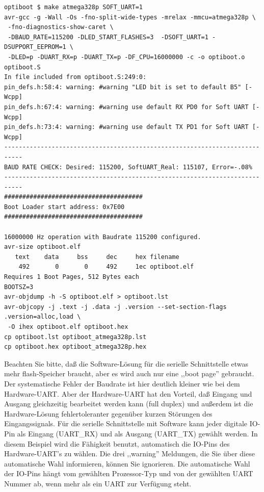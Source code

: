 \begin{verbatim}
optiboot $ make atmega328p SOFT_UART=1
avr-gcc -g -Wall -Os -fno-split-wide-types -mrelax -mmcu=atmega328p \
 -fno-diagnostics-show-caret \
 -DBAUD_RATE=115200 -DLED_START_FLASHES=3  -DSOFT_UART=1 -DSUPPORT_EEPROM=1 \
 -DLED=p -DUART_RX=p -DUART_TX=p -DF_CPU=16000000 -c -o optiboot.o optiboot.S
In file included from optiboot.S:249:0:
pin_defs.h:58:4: warning: #warning "LED bit is set to default B5" [-Wcpp]
pin_defs.h:67:4: warning: #warning use default RX PD0 for Soft UART [-Wcpp]
pin_defs.h:73:4: warning: #warning use default TX PD1 for Soft UART [-Wcpp]
---------------------------------------------------------------------------
BAUD RATE CHECK: Desired: 115200, SoftUART_Real: 115107, Error=-.08%
---------------------------------------------------------------------------
######################################
Boot Loader start address: 0x7E00
######################################

16000000 Hz operation with Baudrate 115200 configured.
avr-size optiboot.elf
   text	   data	    bss	    dec	    hex	filename
    492	      0	      0	    492	    1ec	optiboot.elf
Requires 1 Boot Pages, 512 Bytes each
BOOTSZ=3
avr-objdump -h -S optiboot.elf > optiboot.lst
avr-objcopy -j .text -j .data -j .version --set-section-flags .version=alloc,load \
 -O ihex optiboot.elf optiboot.hex
cp optiboot.lst optiboot_atmega328p.lst
cp optiboot.hex optiboot_atmega328p.hex
\end{verbatim}

Beachten Sie bitte, daß die Software-Lösung für die serielle Schnittstelle etwas mehr flash-Speicher braucht,
aber es wird auch nur eine ,,boot page'' gebraucht. Der systematische Fehler der Baudrate ist hier deutlich kleiner
wie bei dem Hardware-UART.
Aber der Hardware-UART hat den Vorteil, daß Eingang und Ausgang gleichzeitig bearbeitet werden kann (full duplex) und 
außerdem ist die Hardware-Lösung fehlertoleranter gegenüber kurzen Störungen des Eingangssignals.
Für die serielle Schnittstelle mit Software kann jeder digitale IO-Pin als Eingang (UART\_RX) und als Ausgang (UART\_TX)
gewählt werden. In diesem Beispiel wird die Fähigkeit benutzt, automatisch die IO-Pins des Hardware-UART's zu wählen.
Die drei ,,warning'' Meldungen, die Sie über diese automatische Wahl informieren, können Sie ignorieren.
Die automatische Wahl der IO-Pins hängt vom gewählten Prozessor-Typ und von der gewählten UART Nummer ab,
wenn mehr als ein UART zur Verfügung steht.
